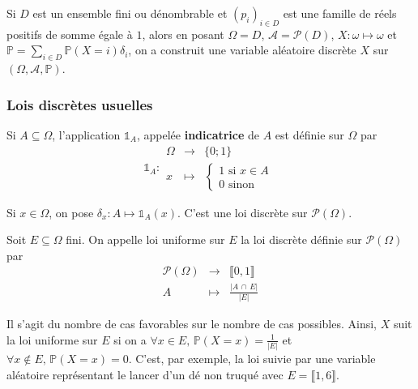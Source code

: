   \begin{remark}
    Si $D$ est un ensemble fini ou dénombrable et $(p_i)_{i \in D}$ est une famille de réels positifs de somme égale à $1$, alors en posant $\Omega = D$, $\mathcal{A} = \mathcal{P}(D)$, $X : \omega \mapsto \omega$ et $\mathbb{P} = \sum_{i \in D} \mathbb{P}(X = i) \delta_i$, on a construit une variable aléatoire discrète $X$ sur $(\Omega, \mathcal{A}, \mathbb{P})$.
  \end{remark}

  \subsubsection{Lois discrètes usuelles}


  \begin{definition}
    Si $A \subseteq \Omega$, l'application $\mathbb{1}_A$, appelée \textbf{indicatrice} de $A$ est définie sur $\Omega$ par
    \[
      \mathbb{1}_A :
      \begin{array}{ccc}
        \Omega &\rightarrow& \{ 0; 1 \} \\
        x &\mapsto& \begin{cases}
          1 \text{ si } x \in A \\
          0 \text{ sinon}
        \end{cases}
      \end{array}
    \]
  \end{definition}

  \begin{example}
    \label{264-1}
    Si $x \in \Omega$, on pose $\delta_x : A \mapsto \mathbb{1}_A(x)$. C'est une loi discrète sur $\mathcal{P}(\Omega)$.
  \end{example}

  \begin{example}
    Soit $E \subseteq \Omega$ fini. On appelle loi uniforme sur $E$ la loi discrète définie sur $\mathcal{P}(\Omega)$ par
    \[
    \begin{array}{ccc}
      \mathcal{P}(\Omega) &\rightarrow& \llbracket 0, 1 \rrbracket \\
      A &\mapsto& \frac{\vert A \, \cap \, E \vert}{\vert E \vert}
    \end{array}
    \]
  \end{example}

  \begin{remark}
    Il s'agit du nombre de cas favorables sur le nombre de cas possibles. Ainsi, $X$ suit la loi uniforme sur $E$ si on a $\forall x \in E, \, \mathbb{P}(X=x) = \frac{1}{\vert E \vert}$ et $\forall x \notin E, \, \mathbb{P}(X=x) = 0$.
    \newpar
    C'est, par exemple, la loi suivie par une variable aléatoire représentant le lancer d'un dé non truqué avec $E = \llbracket 1, 6 \rrbracket$.
  \end{remark}

